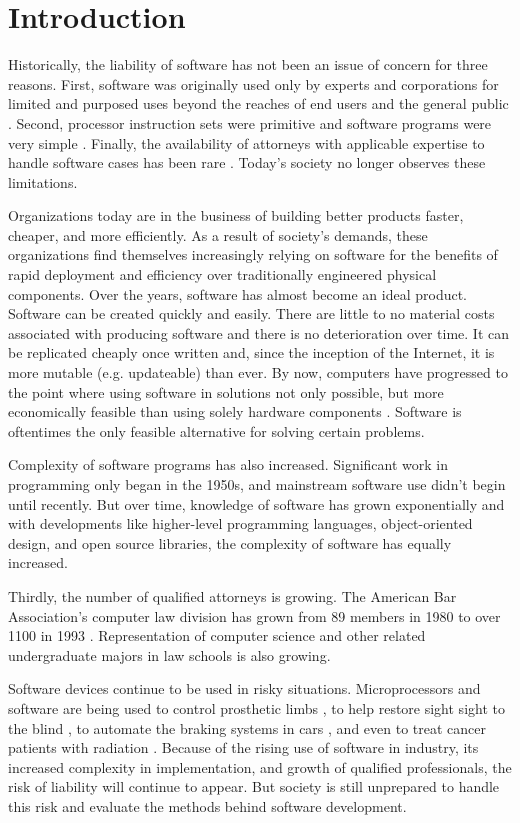\chapter{Introduction}

Historically, the liability of software has not been an issue of
concern for three reasons. First, software was originally used only by experts
and corporations for limited and purposed uses beyond the reaches of end
users and the general public \cite{Leveson95}. Second, processor instruction 
sets were primitive and software programs were very simple \cite{Storey95}. 
Finally, the availability of attorneys with applicable expertise to handle 
software cases has been rare \cite{Armour93}. Today's society no longer observes
these limitations.

Organizations today are in the business of building better products faster,
cheaper, and more efficiently. As a result of society's demands, these
organizations find themselves increasingly relying on software for the benefits
of rapid deployment and efficiency over traditionally engineered physical
components. Over the years, software has almost become an ideal product.
Software can be created quickly and easily. There are little to no material
costs associated with producing software and there is no deterioration over
time. It can be replicated cheaply once written and, since the inception of the
Internet, it is more mutable (e.g. updateable) than ever. By now, computers
have progressed to the point where using software in solutions not only
possible, but more economically feasible than using solely hardware components 
\cite{Baase97}. Software is oftentimes the only feasible alternative for solving
certain problems.

Complexity of software programs has also increased. Significant work in
programming only began in the 1950s, and mainstream software use didn't begin
until recently. But over time, knowledge of software has grown exponentially
and with developments like higher-level programming languages, object-oriented
design, and open source libraries, the complexity of software has equally
increased.

Thirdly, the number of qualified attorneys is growing. The American Bar 
Association's computer law division has grown from 89 members in 1980 to over 
1100 in 1993 \cite{Armour93}. Representation of computer science and other
related undergraduate majors in law schools is also growing.

Software devices continue to be used in risky situations. Microprocessors and
software are being used to control prosthetic limbs \cite{Graupe78}, to help
restore sight sight to the blind \cite{Fox95}, to automate the braking systems
in cars \cite{Hurtig94}, and even to treat cancer patients with radiation
\cite{Leveson93}. Because of the rising use of software in industry, its
increased complexity in implementation, and growth of qualified professionals,
the risk of liability will continue to appear. But society is still unprepared
to handle this risk and evaluate the methods behind software development.


